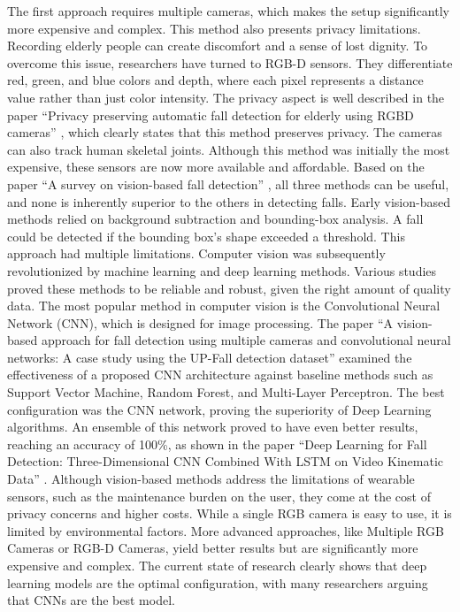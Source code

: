 \documentclass[11pt, a4paper, twoside]{article}
\begin{document}
The first approach requires multiple cameras, which makes the setup significantly more expensive and complex. This method also presents privacy limitations. Recording elderly people can create discomfort and a sense of lost dignity. To overcome this issue, researchers have turned to RGB-D sensors. They differentiate red, green, and blue colors and depth, where each pixel represents a distance value rather than just color intensity. The privacy aspect is well described in the paper ``Privacy preserving automatic fall detection for elderly using RGBD cameras'' \cite{zhang2019privacy}, which clearly states that this method preserves privacy. The cameras can also track human skeletal joints. Although this method was initially the most expensive, these sensors are now more available and affordable. Based on the paper ``A survey on vision-based fall detection'' \cite{zhang2006survey}, all three methods can be useful, and none is inherently superior to the others in detecting falls.
\newline
\newline
Early vision-based methods relied on background subtraction and bounding-box analysis. A fall could be detected if the bounding box's shape exceeded a threshold. This approach had multiple limitations. Computer vision was subsequently revolutionized by machine learning and deep learning methods. Various studies proved these methods to be reliable and robust, given the right amount of quality data. The most popular method in computer vision is the Convolutional Neural Network (CNN), which is designed for image processing. The paper ``A vision-based approach for fall detection using multiple cameras and convolutional neural networks: A case study using the UP-Fall detection dataset'' \cite{espinosa2019vision} examined the effectiveness of a proposed CNN architecture against baseline methods such as Support Vector Machine, Random Forest, and Multi-Layer Perceptron. The best configuration was the CNN network, proving the superiority of Deep Learning algorithms. An ensemble of this network proved to have even better results, reaching an accuracy of 100\%, as shown in the paper ``Deep Learning for Fall Detection: Three-Dimensional CNN Combined With LSTM on Video Kinematic Data'' \cite{lu2018deep}.
\newline
\newline
Although vision-based methods address the limitations of wearable sensors, such as the maintenance burden on the user, they come at the cost of privacy concerns and higher costs. While a single RGB camera is easy to use, it is limited by environmental factors. More advanced approaches, like Multiple RGB Cameras or RGB-D Cameras, yield better results but are significantly more expensive and complex. The current state of research clearly shows that deep learning models are the optimal configuration, with many researchers arguing that CNNs are the best model.
\end{document}

